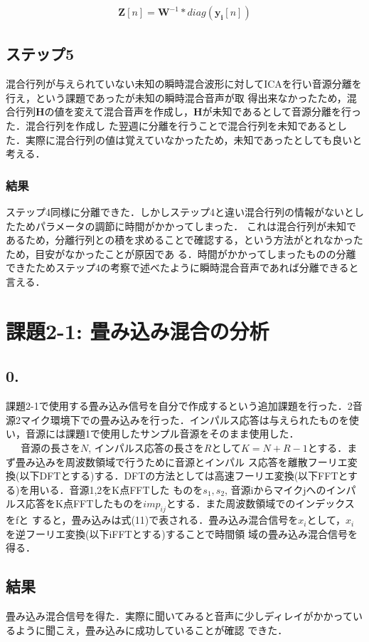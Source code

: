 \documentclass[a4j]{jarticle}
\begin{document}
\begin{eqnarray}
 \bm{Z}[n] = \bm{W}^{-1} * diag(\bm{y_i}[n])
\end{eqnarray}

\subsection*{ステップ5}
混合行列が与えられていない未知の瞬時混合波形に対してICAを行い音源分離を行え，という課題であったが未知の瞬時混合音声が取
得出来なかったため，混合行列$\bm{H}$の値を変えて混合音声を作成し，$\bm{H}$が未知であるとして音源分離を行った．混合行列を作成し
た翌週に分離を行うことで混合行列を未知であるとした．実際に混合行列の値は覚えていなかったため，未知であったとしても良いと
考える．
\subsubsection*{結果}
ステップ4同様に分離できた．しかしステップ4と違い混合行列の情報がないとしたためパラメータの調節に時間がかかってしまった．
これは混合行列が未知であるため，分離行列との積を求めることで確認する，という方法がとれなかったため，目安がなかったことが原因であ
る．時間がかかってしまったものの分離できたためステップ4の考察で述べたように瞬時混合音声であれば分離できると言える．

\section*{課題2-1: 畳み込み混合の分析}
\subsection*{0.}
課題2-1で使用する畳み込み信号を自分で作成するという追加課題を行った．2音
源2マイク環境下での畳み込みを行った．インパルス応答は与えられたものを使
い，音源には課題1で使用したサンプル音源をそのまま使用した．\\ \ \ \ 
音源の長さを$N$, インパルス応答の長さを$R$として$K = N + R -1$とする．まず畳み込みを周波数領域で行うために音源とインパル
ス応答を離散フーリエ変換(以下DFTとする)する．DFTの方法としては高速フーリエ変換(以下FFTとする)を用いる．音源1,2をK点FFTした
ものを$s_1, s_2$, 音源iからマイクjへのインパルス応答をK点FFTしたものを$imp_{ij}$とする．また周波数領域でのインデックスをfと
すると，畳み込みは式(11)で表される．畳み込み混合信号を$x_i$として，$x_i$を逆フーリエ変換(以下iFFTとする)することで時間領
域の畳み込み混合信号を得る．
\subsection*{結果}
畳み込み混合信号を得た．実際に聞いてみると音声に少しディレイがかかっているように聞こえ，畳み込みに成功していることが確認
できた．
\end{document}
